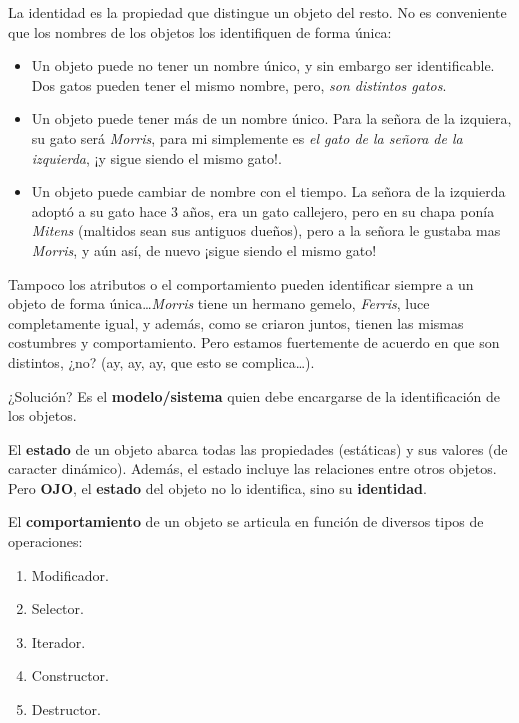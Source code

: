 \vspace*{2.5mm}

La identidad es la propiedad que distingue un objeto del resto. No es conveniente que los nombres de los objetos los identifiquen
de forma única:
\begin{itemize}
    \item Un objeto puede no tener un nombre único, y sin embargo ser identificable. Dos gatos pueden tener el mismo nombre,
    pero, \textit{son distintos gatos}.
    \item Un objeto puede tener más de un nombre único. Para la señora de la izquiera, su gato será \textit{Morris}, para mi
    simplemente es \textit{el gato de la señora de la izquierda}, ¡y sigue siendo el mismo gato!.
    \item Un objeto puede cambiar de nombre con el tiempo. La señora de la izquierda adoptó a su gato hace 3 años, era un gato
    callejero, pero en su chapa ponía \textit{Mitens} (maltidos sean sus antiguos dueños), pero a la señora le gustaba mas
    \textit{Morris}, y aún así, de nuevo ¡sigue siendo el mismo gato!
\end{itemize}

\noindent Tampoco los atributos o el comportamiento pueden identificar siempre a un objeto de forma única\dots\space\textit{Morris} tiene un 
hermano gemelo, \textit{Ferris}, luce completamente igual, y además, como se criaron juntos, tienen las mismas costumbres y
comportamiento. Pero estamos fuertemente de acuerdo en que son distintos, ¿no? (ay, ay, ay, que esto se complica\dots).

¿Solución? Es el \textbf{modelo/sistema} quien debe encargarse de la identificación de los objetos.

\vspace*{5mm}

\noindent El \textbf{estado} de un objeto abarca todas las propiedades (estáticas) y sus valores (de caracter dinámico). Además, el estado
incluye las relaciones entre otros objetos. Pero \textbf{OJO}, el \textbf{estado} del objeto no lo identifica, sino su 
\textbf{identidad}.

\vspace*{5mm}

\noindent El \textbf{comportamiento} de un objeto se articula en función de diversos tipos de operaciones:
\begin{enumerate}
    \item Modificador.
    \item Selector.
    \item Iterador.
    \item Constructor.
    \item Destructor.
\end{enumerate}
